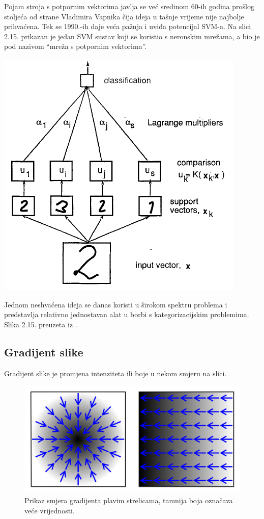 \documentclass[times, utf8, zavrsni]{fer}
\begin{document}
Pojam stroja s potpornim vektorima javlja se već sredinom 60-ih godina prošlog stoljeća od strane
Vladimira Vapnika čija ideja u tašnje vrijeme nije najbolje prihvaćena. Tek se 1990.-ih daje 
veća pažnja i uviđa potencijal SVM-a. Na slici 2.15. prikazan je jedan SVM sustav koji se koristio s
neronskim mrežama, a bio je pod nazivom \enquote{mreža s potpornim vektorima}.

\begin{minipage}{\linewidth}
\vspace{10pt}
\centering
\includegraphics[width=0.7\linewidth]{img/svmnn.png}
\end{minipage}

\bigbreak

Jednom neshvaćena ideja se danas koristi u širokom spektru problema i predstavlja relativno
jednostavan alat u borbi s kategorizacijskim problemima. Slika 2.15. preuzeta iz \cite{vapnik}.


\newpage

\subsection{Gradijent slike}

Gradijent slike je promjena intenziteta ili boje u nekom smjeru na slici.

\begin{figure}[htbp]
\centering
\includegraphics[width=0.8\linewidth]{img/Gradient2.png}
\caption{Prikaz smjera gradijenta plavim strelicama, tamnija boja označava veće vrijednosti.}
\end{figure}
\end{document}
